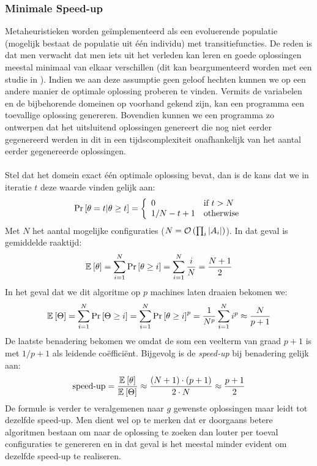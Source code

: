 \subsubsection{Minimale Speed-up}

Metaheuristieken worden ge\"implementeerd als een evoluerende populatie (mogelijk bestaat de populatie uit \'e\'en individu) met transitiefuncties. De reden is dat men verwacht dat men iets uit het verleden kan leren en goede oplossingen meestal minimaal van elkaar verschillen (dit kan beargumenteerd worden met een studie in \cite{kirkPatrick}). Indien we aan deze assumptie geen geloof hechten kunnen we op een andere manier de optimale oplossing proberen te vinden. Vermits de variabelen en de bijbehorende domeinen op voorhand gekend zijn, kan een programma een toevallige oplossing genereren. Bovendien kunnen we een programma zo ontwerpen dat het uitsluitend oplossingen genereert die nog niet eerder gegenereerd werden in dit in een tijdscomplexiteit onafhankelijk van het aantal eerder gegenereerde oplossingen.
\paragraph{}
Stel dat het domein exact \'e\'en optimale oplossing bevat, dan is de kans dat we in iteratie $t$ deze waarde vinden gelijk aan:
\begin{equation}
\Pr\left[\theta=t|\theta\geq t\right]=\left\{\begin{array}{ll}
0&\mbox{if }t>N\\
1/N-t+1&\mbox{otherwise}
\end{array}\right.
\end{equation}
Met $N$ het aantal mogelijke configuraties ($N=\mathcal{O}\left(\prod_i\left| A_i\right|\right)$). In dat geval is gemiddelde raaktijd:
\begin{equation}
\mathbb{E}_{}\left[\theta\right]=\displaystyle\sum_{i=1}^N\Pr\left[\theta\geq i\right]=\displaystyle\sum_{i=1}^N\displaystyle\frac{i}{N}=\displaystyle\frac{N+1}{2}
\end{equation}
In het geval dat we dit algoritme op $p$ machines laten draaien bekomen we:
\begin{equation}
\mathbb{E}_{}\left[\Theta\right]=\displaystyle\sum_{i=1}^N\Pr\left[\Theta\geq i\right]=\displaystyle\sum_{i=1}^N\Pr\left[\theta\geq i\right]^p=\displaystyle\frac{1}{N^p}\displaystyle\sum_{i=1}^Ni^p\approx\displaystyle\frac{N}{p+1}
\end{equation}
De laatste benadering bekomen we omdat de som een veelterm van graad $p+1$ is met $1/p+1$ als leidende co\"effici\"ent. Bijgevolg is de \emph{speed-up} bij benadering gelijk aan:
\begin{equation}
\mbox{speed-up}=\displaystyle\frac{\mean{\hittime}}{\mean{\phittime}}\approx\displaystyle\frac{\brak{N+1}\cdot\brak{p+1}}{2\cdot N}\approx\displaystyle\frac{p+1}{2}
\eqnlab{minimalSpeedupMetaheuristic}
\end{equation}
De formule is verder te veralgemenen naar $g$ gewenste oplossingen maar leidt tot dezelfde speed-up. Men dient wel op te merken dat er doorgaans betere algoritmen bestaan om naar de oplossing te zoeken dan louter per toeval configuraties te genereren en in dat geval is het meestal minder evident om dezelfde speed-up te realiseren.



